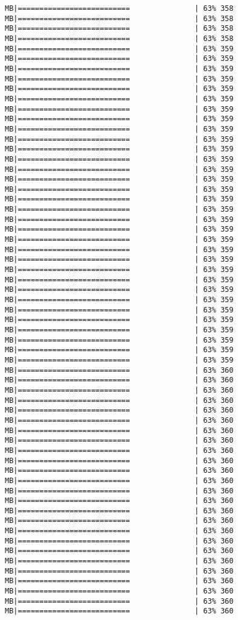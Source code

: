 \documentclass[
]{article}
\begin{document}
\begin{verbatim}
MB|==========================               | 63% 358 MB|==========================               | 63% 358 MB|==========================               | 63% 358 MB|==========================               | 63% 358 MB|==========================               | 63% 359 MB|==========================               | 63% 359 MB|==========================               | 63% 359 MB|==========================               | 63% 359 MB|==========================               | 63% 359 MB|==========================               | 63% 359 MB|==========================               | 63% 359 MB|==========================               | 63% 359 MB|==========================               | 63% 359 MB|==========================               | 63% 359 MB|==========================               | 63% 359 MB|==========================               | 63% 359 MB|==========================               | 63% 359 MB|==========================               | 63% 359 MB|==========================               | 63% 359 MB|==========================               | 63% 359 MB|==========================               | 63% 359 MB|==========================               | 63% 359 MB|==========================               | 63% 359 MB|==========================               | 63% 359 MB|==========================               | 63% 359 MB|==========================               | 63% 359 MB|==========================               | 63% 359 MB|==========================               | 63% 359 MB|==========================               | 63% 359 MB|==========================               | 63% 359 MB|==========================               | 63% 359 MB|==========================               | 63% 359 MB|==========================               | 63% 359 MB|==========================               | 63% 359 MB|==========================               | 63% 359 MB|==========================               | 63% 359 MB|==========================               | 63% 360 MB|==========================               | 63% 360 MB|==========================               | 63% 360 MB|==========================               | 63% 360 MB|==========================               | 63% 360 MB|==========================               | 63% 360 MB|==========================               | 63% 360 MB|==========================               | 63% 360 MB|==========================               | 63% 360 MB|==========================               | 63% 360 MB|==========================               | 63% 360 MB|==========================               | 63% 360 MB|==========================               | 63% 360 MB|==========================               | 63% 360 MB|==========================               | 63% 360 MB|==========================               | 63% 360 MB|==========================               | 63% 360 MB|==========================               | 63% 360 MB|==========================               | 63% 360 MB|==========================               | 63% 360 MB|==========================               | 63% 360 MB|==========================               | 63% 360 MB|==========================               | 63% 360 MB|==========================               | 63% 360 MB|==========================               | 63% 360 
\end{verbatim}
\end{document}
